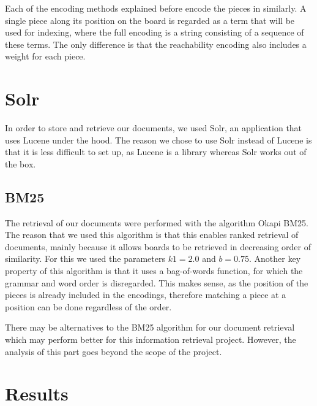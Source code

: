 \documentclass[11pt]{article}
\begin{document}
    Each of the encoding methods explained before encode the pieces in similarly. A single piece along its position on the board is regarded as a term that will be used for indexing, where the full encoding is a string consisting of a sequence of these terms. The only difference is that the reachability encoding also includes a weight for each piece.


    \section{Solr}

    In order to store and retrieve our documents, we used Solr, an application that uses Lucene under the hood. The reason we chose to use Solr instead of Lucene is that it is less difficult to set up, as Lucene is a library whereas Solr works out of the box.

    \subsection{BM25}

    The retrieval of our documents were performed with the algorithm Okapi BM25. The reason that we used this algorithm is that this enables ranked retrieval of documents, mainly because it allows boards to be retrieved in decreasing order of similarity. For this we used the parameters $k1 = 2.0$ and $b = 0.75$. Another key property of this algorithm is that it uses a bag-of-words function, for which the grammar and word order is disregarded. This makes sense, as the position of the pieces is already included in the encodings, therefore matching a piece at a position can be done regardless of the order.


    There may be alternatives to the BM25 algorithm for our document retrieval which may perform better for this information retrieval project. However, the analysis of this part goes beyond the scope of the project.





    \section{Results}
\end{document}
